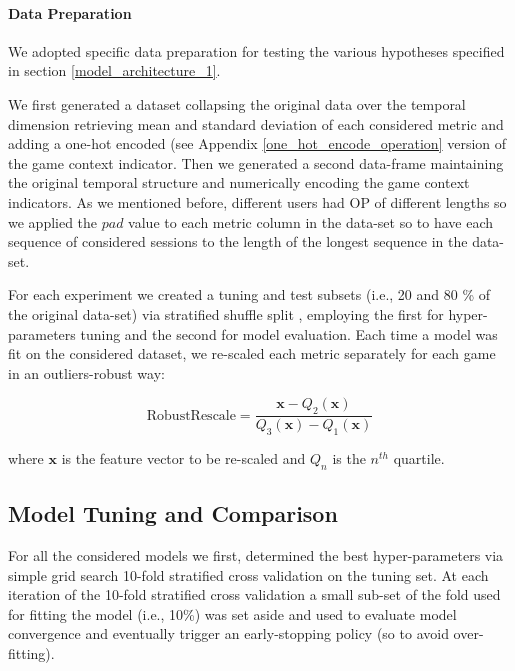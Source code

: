 

\paragraph*{Data Preparation}
\label{data_preparation_1}
We adopted specific data preparation for testing the various hypotheses specified in section \ref{model_architecture_1}. 

We first generated a dataset collapsing the original data over the temporal dimension retrieving mean and standard deviation of each considered metric and adding a one-hot encoded (see Appendix \ref{one_hot_encode_operation} version of the game context indicator. Then we generated a second data-frame maintaining the original temporal structure and numerically encoding the game context indicators. As we mentioned before, different users had OP of different lengths so we applied the $pad$ value to each metric column in the data-set so to have each sequence of considered sessions to the length of the longest sequence in the data-set. 

For each experiment we created a tuning and test subsets (i.e., 20 and 80 \% of the original data-set) via stratified shuffle split \cite{scikit-learn}, employing the first for hyper-parameters tuning and the second for model evaluation. Each time a model was fit on the considered dataset, we re-scaled each metric separately for each game in an outliers-robust way:

\begin{equation}
\label{robustscaler}
    \text{RobustRescale}=
        \dfrac
            {\mathbf{x} - Q_2(\mathbf{x})}
            {Q_3(\mathbf{x}) - Q_1(\mathbf{x})}
\end{equation}

where $\mathbf{x}$ is the feature vector to be re-scaled and $Q_n$ is the $n^{th}$ quartile. 

\subsection{Model Tuning and Comparison}
\label{tuning_comparison_1}
For all the considered models we first, determined the best hyper-parameters via simple grid search 10-fold stratified cross validation \cite{scikit-learn} on the tuning set. At each iteration of the 10-fold stratified cross validation a small sub-set of the fold used for fitting the model (i.e., 10\%) was set aside and used to evaluate model convergence and eventually trigger an early-stopping policy (so to avoid over-fitting). 


